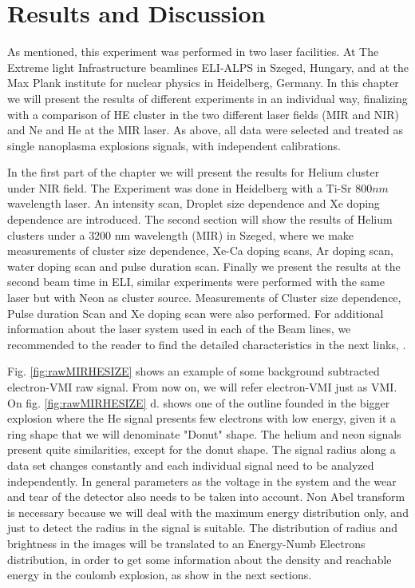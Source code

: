 
\chapter{Results and Discussion}

As mentioned, this experiment was performed in two laser facilities. At The Extreme light Infrastructure beamlines ELI-ALPS in Szeged, Hungary, and at the Max Plank institute for nuclear physics in Heidelberg, Germany. In this chapter we will present the results of different experiments in an individual way, finalizing with a comparison of HE cluster in the two different laser fields (MIR and NIR) and Ne and He at the MIR laser. As above, all data were selected and treated as single nanoplasma explosions signals, with independent calibrations.

In the first part of the chapter we will present the results for Helium cluster under NIR field. The Experiment was done in Heidelberg with a Ti-Sr $800nm$ wavelength laser. An intensity scan, Droplet size dependence and Xe doping dependence are introduced. The second section will show the results of Helium clusters under a $3200$ nm wavelength (MIR) in Szeged, where we make measurements  of  cluster size dependence, Xe-Ca doping scans, Ar doping scan,  water doping scan and pulse duration scan. Finally we present the results at the second beam time in ELI, similar experiments were performed with the same laser but with Neon as cluster source. Measurements of Cluster size dependence, Pulse duration Scan and Xe doping scan were also performed. For additional information about the laser system used in each of the Beam lines, we recommended to the reader to find the detailed characteristics in the next links, \cite {thire_highly_2018}.


Fig. \ref{fig:rawMIRHESIZE} shows an example of some background subtracted electron-VMI raw signal. From now on, we will refer electron-VMI just as VMI. On fig. \ref{fig:rawMIRHESIZE} d. shows one of the outline founded in the bigger explosion  where the He signal presents few electrons with low energy, given it a ring shape that we will denominate "Donut" shape. The helium and neon signals present quite similarities, except for the donut shape. The signal radius along a data set changes constantly and each individual signal need to be analyzed independently. In general parameters as the voltage in the system and the wear and tear of the detector also needs to be taken into account. Non Abel transform is necessary because we will deal with the maximum energy distribution only, and just to detect the radius in the signal is suitable. The distribution of radius and brightness in the images will be translated to an Energy-Numb Electrons distribution, in order to get some information about the density and reachable energy in the coulomb explosion, as show in the next sections.

